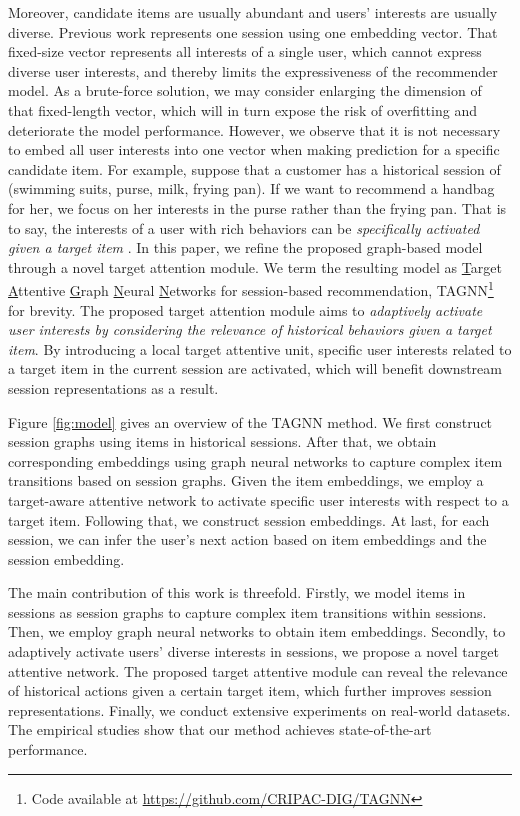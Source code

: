 \documentclass[sigconf]{acmart}
\begin{document}
Moreover, candidate items are usually abundant and users' interests are usually diverse. Previous work \cite{Li:2017hk,Liu:2018er,Wu:2019ke} represents one session using one embedding vector. That fixed-size vector represents all interests of a single user, which cannot express diverse user interests, and thereby limits the expressiveness of the recommender model. As a brute-force solution, we may consider enlarging the dimension of that fixed-length vector, which will in turn expose the risk of overfitting and deteriorate the model performance. However, we observe that it is not necessary to embed all user interests into one vector when making prediction for a specific candidate item. For example, suppose that a customer has a historical session of (swimming suits, purse, milk, frying pan). If we want to recommend a handbag for her, we focus on her interests in the purse rather than the frying pan. That is to say, the interests of a user with rich behaviors can be \emph{specifically activated given a target item} \cite{Zhou:2018bb}.
In this paper, we refine the proposed graph-based model through a novel target attention module. We term the resulting model as {\underline T}arget {\underline A}ttentive {\underline G}raph {\underline N}eural {\underline N}etworks for session-based recommendation, TAGNN\footnote{Code available at \url{https://github.com/CRIPAC-DIG/TAGNN}} for brevity. The proposed target attention module aims to \emph{adaptively activate user interests by considering the relevance of historical behaviors given a target item}. By introducing a local target attentive unit, specific user interests related to a target item in the current session are activated, which will benefit downstream session representations as a result.

Figure \ref{fig:model} gives an overview of the TAGNN method. We first construct session graphs using items in historical sessions.
After that, we obtain corresponding embeddings using graph neural networks to capture complex item transitions based on session graphs. Given the item embeddings, we employ a target-aware attentive network to activate specific user interests with respect to a target item. Following that, we construct session embeddings. At last, for each session, we can infer the user's next action based on item embeddings and the session embedding.


The main contribution of this work is threefold. Firstly, we model items in sessions as session graphs to capture complex item transitions within sessions. Then, we employ graph neural networks to obtain item embeddings. Secondly, to adaptively activate users' diverse interests in sessions, we propose a novel target attentive network. The proposed target attentive module can reveal the relevance of historical actions given a certain target item, which further improves session representations. Finally, we conduct extensive experiments on real-world datasets. The empirical studies show that our method achieves state-of-the-art performance.
\end{document}
